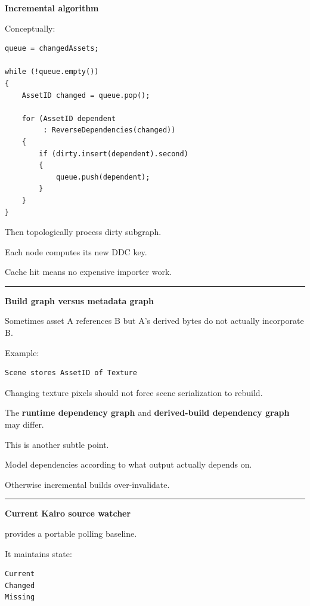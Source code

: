 \textbf{Incremental algorithm}

Conceptually:

\begin{verbatim}
queue = changedAssets;

while (!queue.empty())
{
    AssetID changed = queue.pop();

    for (AssetID dependent
         : ReverseDependencies(changed))
    {
        if (dirty.insert(dependent).second)
        {
            queue.push(dependent);
        }
    }
}
\end{verbatim}

Then topologically process dirty subgraph.

Each node computes its new DDC key.

Cache hit means no expensive importer work.

\begin{center}\rule{0.5\linewidth}{0.5pt}\end{center}

\textbf{Build graph versus metadata graph}

Sometimes asset A references B but A's derived bytes do not actually incorporate B.

Example:

\begin{verbatim}
Scene stores AssetID of Texture
\end{verbatim}

Changing texture pixels should not force scene serialization to rebuild.

The \textbf{runtime dependency graph} and \textbf{derived-build dependency graph} may differ.

This is another subtle point.

Model dependencies according to what output actually depends on.

Otherwise incremental builds over-invalidate.

\begin{center}\rule{0.5\linewidth}{0.5pt}\end{center}

\textbf{Current Kairo source watcher}

 provides a portable polling baseline.

It maintains state:

\begin{verbatim}
Current
Changed
Missing
\end{verbatim}

